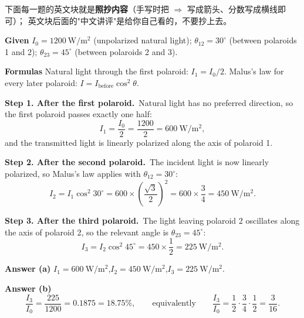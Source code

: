﻿\documentclass[11pt]{ctexart}
\begin{document}

下面每一题的英文块就是\textbf{照抄内容}（手写时把 $\Rightarrow$ 写成箭头、分数写成横线即可）；
英文块后面的"中文讲评"是给你自己看的，不要抄上去。

\qbreak
{}


\textbf{Given}\quad
$I_0=1200\ \mathrm{W/m^2}$ (unpolarized natural light);\;
$\theta_{12}=30^\circ$ (between polaroids 1 and 2);\;
$\theta_{23}=45^\circ$ (between polaroids 2 and 3).

\textbf{Formulas}\quad
Natural light through the first polaroid: $I_1=I_0/2$.\;
Malus's law for every later polaroid: $I=I_{\text{before}}\cos^2\theta$.

\textbf{Step 1. After the first polaroid.}\ Natural light has no preferred direction, so the first polaroid passes exactly one half:
\[
I_1=\frac{I_0}{2}=\frac{1200}{2}=600\ \mathrm{W/m^2},
\]
and the transmitted light is linearly polarized along the axis of polaroid 1.

\textbf{Step 2. After the second polaroid.}\ The incident light is now linearly polarized, so Malus's law applies with
$\theta_{12}=30^\circ$:
\[
I_2=I_1\cos^2 30^\circ=600\times\left(\frac{\sqrt3}{2}\right)^2=600\times\frac34
=450\ \mathrm{W/m^2}.
\]

\textbf{Step 3. After the third polaroid.}\ The light leaving polaroid 2 oscillates along the axis of polaroid 2, so the relevant angle is
$\theta_{23}=45^\circ$:
\[
I_3=I_2\cos^2 45^\circ=450\times\frac12=225\ \mathrm{W/m^2}.
\]

\textbf{Answer (a)}\quad
$I_1=600\ \mathrm{W/m^2}$,\quad $I_2=450\ \mathrm{W/m^2}$,\quad $I_3=225\ \mathrm{W/m^2}$.

\textbf{Answer (b)}\quad
\[
\frac{I_3}{I_0}=\frac{225}{1200}=0.1875=18.75\%,
\qquad\text{equivalently}\qquad
\frac{I_3}{I_0}=\frac12\cdot\frac34\cdot\frac12=\frac{3}{16}.
\]
\end{document}
